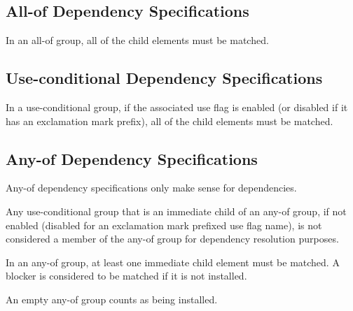\subsection{All-of Dependency Specifications}

In an all-of group, all of the child elements must be matched.

\subsection{Use-conditional Dependency Specifications}

In a use-conditional group, if the associated use flag is enabled (or disabled if it has an
exclamation mark prefix), all of the child elements must be matched.

\subsection{Any-of Dependency Specifications}

Any-of dependency specifications only make sense for dependencies.

Any use-conditional group that is an immediate child of an any-of group, if not enabled (disabled
for an exclamation mark prefixed use flag name), is not considered a member of the any-of group
for dependency resolution purposes.

In an any-of group, at least one immediate child element must be matched. A blocker is
considered to be matched if it is not installed.

An empty any-of group counts as being installed.



